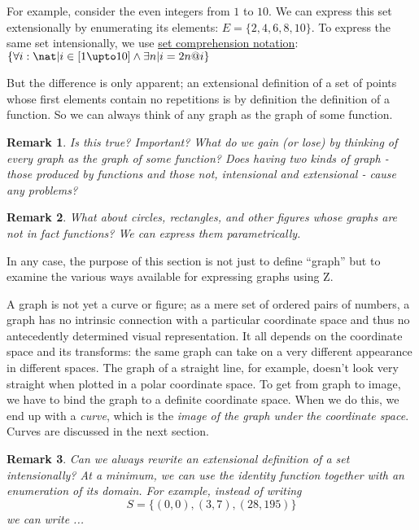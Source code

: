 \documentclass[12pt]{tufte-handout}
\numberwithin{equation}{subsection}
\numberwithin{equation}{subsection}
\newtheorem{remark}{Remark}
\newcommand\cspace{coordinate space}
\begin{document}
{  For example, consider the even integers from \(1\) to \(10\).  We
  can express this set extensionally by enumerating its elements: \(E
  = \{2,4,6,8,10\}\).  To express the same set intensionally, we use
  \hyperref[subs:setcomp]{set comprehension notation}: \(\{\forall
  i:\nat | i\in [1\upto 10] \land \exists n | i = 2n @ i \}\)

  But the difference is only apparent; an extensional definition of a
  set of points whose first elements contain no repetitions is by
  definition the definition of a function.  So we can always think of
  any graph as the graph of some function.

  \begin{remark}
    Is this true?  Important?  What do we gain (or lose) by thinking
    of every graph as the graph of some function?  Does having two
    kinds of graph - those produced by functions and those not,
    intensional and extensional - cause any problems?
  \end{remark}

  \begin{remark}
    What about circles, rectangles, and other figures whose graphs are
    not in fact functions?  We can express them parametrically.
  \end{remark}

  {\todo In any case, the purpose of this section is not just to
    define ``graph'' but to examine the various ways available for
    expressing graphs using Z.}

  A graph is not yet a curve or figure; as a mere set of ordered pairs
  of numbers, a graph has no intrinsic connection with a
  particular \cspace{} and thus no antecedently determined visual
  representation.  It all depends on the \cspace{} and its transforms:
  the same graph can take on a very different appearance in different
  spaces.  The graph of a straight line, for example, doesn't look
  very straight when plotted in a polar \cspace{}.  To get from graph
  to image, we have to bind the graph to a definite \cspace{}.  When
  we do this, we end up with a \textit{curve}, which is the
  \textit{image of the graph under the \cspace{}}.  Curves are
  discussed in the next section.

  \begin{remark}
    Can we always rewrite an extensional definition of a set
    intensionally?  At a minimum, we can use the identity function
    together with an enumeration of its domain.  For example, instead
    of writing \[S=\{ (0,0), (3,7), (28,195)\}\] we can write ...
  \end{remark}

}
\end{document}

